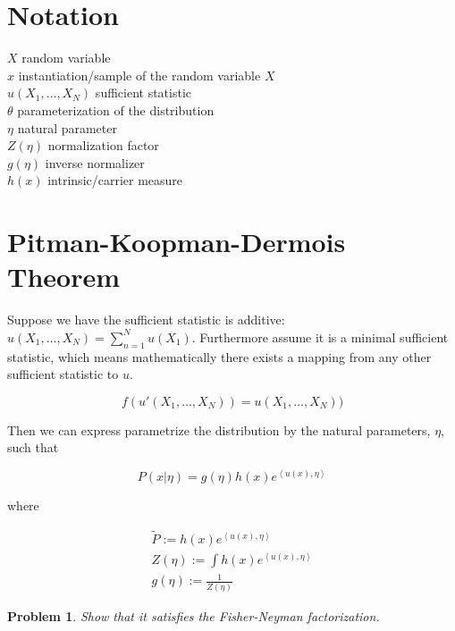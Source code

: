 \documentclass[a4paper]{article}
\newtheorem{problem}{Problem}[section]
\begin{document}
\section{Notation}

$X$ random variable \\ 
$x$ instantiation/sample of the random variable $X$ \\
$u(X_1, \ldots, X_N)$ sufficient statistic \\
$\theta$ parameterization of the distribution \\
$\eta$ natural parameter \\
$Z(\eta)$ normalization factor \\
$g(\eta)$ inverse normalizer \\
$h(x)$ intrinsic/carrier measure

\section{Pitman-Koopman-Dermois Theorem}

Suppose we have the sufficient statistic is additive: $ u(X_1,\ldots,X_N) = \sum_{n=1}^N u(X_1) $.  Furthermore assume it is a minimal sufficient statistic, which means mathematically there exists a mapping from any other sufficient statistic to $u$.

\begin{equation}
  f( u'(X_1,\ldots,X_N) ) = u(X_1,\ldots,X_N) )
  \label{}
\end{equation}

Then we can express parametrize the distribution by the natural parameters, $\eta$, such that

\begin{equation}
  P( x \vert \eta) = g(\eta) h(x) e^{ \left< u(x), \eta \right>}
  \label{}
\end{equation}

where 

\begin{equation}
  \begin{split}
    \tilde{P} := h(x) e^{ \left< u(x), \eta \right> } \\
    Z(\eta) := \int h(x) e^{ \left< u(x), \eta \right> } \\
    g(\eta) := \frac{1}{Z(\eta)}
  \end{split}
  \label{}
\end{equation}

\begin{problem}
Show that it satisfies the Fisher-Neyman factorization.
\end{problem}
\end{document}
